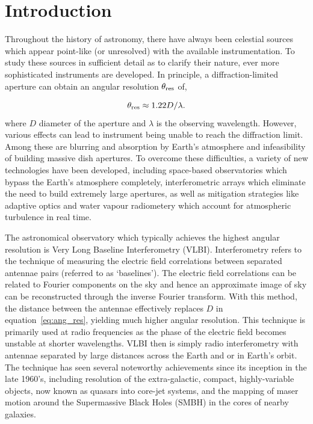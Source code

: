 \chapter{Introduction}

Throughout the history of astronomy, there have always been celestial sources which appear point-like (or unresolved) with the available instrumentation. To study these sources in sufficient detail as to clarify their nature, ever more sophisticated instruments are developed. In principle, a diffraction-limited aperture can obtain an angular resolution $\theta_{\rm res}$ of,

\begin{equation}\label{eq:ang_res}
 \theta_{\rm res} \approx 1.22 D / \lambda.
\end{equation}
where $D$ diameter of the aperture and $\lambda$ is the observing wavelength. However, various effects can lead to instrument being unable to reach the diffraction limit. Among these are blurring and absorption by Earth's atmosphere and infeasibility of building massive dish apertures. To overcome these difficulties, a variety of new technologies have been developed, including space-based observatories which bypass the Earth's atmosphere completely, interferometric arrays which eliminate the need to build extremely large apertures, as well as mitigation strategies like adaptive optics and water vapour radiometery which account for atmospheric turbulence in real time.  


The astronomical observatory which typically achieves the highest angular resolution is Very Long Baseline Interferometry (VLBI). Interferometry  refers to the technique of measuring the electric field correlations between separated antennae pairs (referred to as `baselines'). The electric field correlations can be related to Fourier components on the sky and hence an approximate image of sky can be reconstructed through the inverse Fourier transform. With this method, the distance between the antennae effectively replaces $D$ in equation~\ref{eq:ang_res}, yielding much higher angular resolution. This technique is primarily used at radio frequencies as the phase of the electric field becomes unstable at shorter wavelengths. VLBI then is simply radio interferometry with antennae separated by large distances across the Earth and or in Earth's orbit. The technique has seen several noteworthy achievements since its inception in the late 1960's, including resolution of the extra-galactic, compact, highly-variable objects, now known as quasars into core-jet systems, and the mapping of maser motion around the Supermassive Black Holes (SMBH) in the cores of nearby galaxies.

